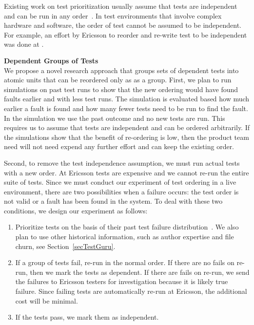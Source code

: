 Existing work on test prioritization usually assume that tests are independent and can be run in any order~\cite{Marijan2013ICSM,Elbaum2014FSE,Hemmati2015ICVV}. In test environments that involve complex hardware and software, the order of test cannot be assumed to be independent. For example, an effort by Ericsson  to reorder and re-write test to be independent was done at . 

\textbf{Dependent Groups of Tests}\\
We propose a novel research approach that groups sets of dependent tests into atomic units that can be reordered only as as a group. 
%
First, we plan to run simulations on past test runs to show that the new ordering would have found faults earlier and with less test runs. The simulation is evaluated based how much earlier a fault is found and how many fewer tests need to be run to find the fault. 
%
In the simulation we use the past outcome and no new tests are run. This requires us to assume that tests are independent and can be ordered arbitrarily. If the simulations show that the benefit of re-ordering is low, then the product team need will not need expend any further effort and can keep the existing order.

Second, to remove the test independence assumption, we must run actual tests with a new order. At Ericsson tests are expensive and we cannot re-run the entire suite of tests. 
%
Since we must conduct our experiment of test ordering in a live environment, there are two possibilities when a failure occurs: the test order is not valid or a fault has been found in the system. To deal with these two conditions, we design our experiment as follows:

\begin{enumerate}

\item Prioritize tests on the basis of their past test failure distribution~\cite{Kim2002ICSE,Hemmati}. We also plan to use other historical information, such as author expertise and file churn, see Section~\ref{secTestGuru}.

\item If a group of tests fail, re-run in the normal order. If there are no fails on re-run, then we mark the tests as dependent. If there are fails on re-run, we send the failures to Ericsson testers for investigation because it is likely true failure. Since failing tests are automatically re-run at Ericsson, the additional cost will be minimal.
 
\item If the tests pass, we mark them as independent.

\end{enumerate}

